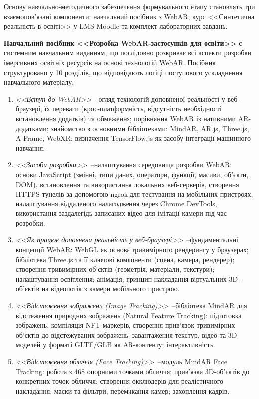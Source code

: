 Основу навчально-методичного забезпечення формувального етапу становлять три взаємопов'язані компоненти: навчальний посібник з WebAR, курс <<Синтетична реальність в освіті>> у LMS Moodle та комплект лабораторних завдань.

\textbf{Навчальний посібник <<Розробка WebAR-застосунків для освіти>>} є системним навчальним виданням, що послідовно розкриває всі аспекти розробки імерсивних освітніх ресурсів на основі технологій WebAR. Посібник структуровано у 10 розділів, що відповідають логіці поступового ускладнення навчального матеріалу:

\begin{enumerate}
\item \textit{<<Вступ до WebAR>>}~--огляд технологій доповненої реальності у веб-браузері, їх переваги (крос-платформність, відсутність необхідності встановлення додатків) та обмеження; порівняння WebAR із нативними AR-додатками; знайомство з основними бібліотеками: MindAR, AR.js, Three.js, A-Frame, WebXR; визначення TensorFlow.js як засобу інтеграції машинного навчання.

\item \textit{<<Засоби розробки>>}~--налаштування середовища розробки WebAR: основи JavaScript (змінні, типи даних, оператори, функції, масиви, об'єкти, DOM), встановлення та використання локальних веб-серверів, створення HTTPS-тунелів за допомогою ngrok для тестування на мобільних пристроях, налаштування віддаленого налагодження через Chrome DevTools, використання заздалегідь записаних відео для імітації камери під час розробки.

\item \textit{<<Як працює доповнена реальність у веб-браузері>>}~--фундаментальні концепції WebAR: WebGL як основа тривимірного рендерингу у браузерах; бібліотека Three.js та її ключові компоненти (сцена, камера, рендерер); створення тривимірних об'єктів (геометрія, матеріали, текстури); налаштування освітлення; анімація; принцип накладання віртуальних 3D-об'єктів на відеопотік з камери мобільного пристрою.

\item \textit{<<Відстеження зображень (Image Tracking)>>}~--бібліотека MindAR для відстеження природних зображень (Natural Feature Tracking): підготовка зображень, компіляція NFT маркерів, створення прив'язок тривимірних об'єктів до відстежуваних зображень; завантаження текстур, відео та 3D-моделей у форматі GLTF/GLB як AR-контенту; інтерактивність.

\item \textit{<<Відстеження обличчя (Face Tracking)>>}~--модуль MindAR Face Tracking: робота з 468 опорними точками обличчя; прив'язка 3D-об'єктів до конкретних точок обличчя; створення окклюдерів для реалістичного накладання; маски та фільтри; перемикання камер; захоплення кадрів.


\end{enumerate}
